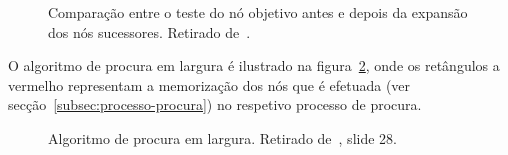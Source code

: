 \begin{figure}[H]
    \begin{center}
    \end{center}
    \caption{Comparação entre o teste do nó objetivo antes e depois da expansão dos nós sucessores.
    Retirado de~\cite{ist:leic:resumos:procura-cega}.}
    \label{fig:alg-proc-largura-teste}
\end{figure}

O algoritmo de procura em largura é ilustrado na figura~\ref{fig:alg-proc-largura}, onde os retângulos a vermelho representam a memorização dos nós que é efetuada (ver secção~\ref{subsec:processo-procura}) no respetivo processo de procura.

\begin{figure}[H]
    \begin{center}
    \end{center}
    \caption{Algoritmo de procura em largura. Retirado de~\cite{isel:iasa:slides:proc-espaco-estados-parte-1}, slide 28.}
    \label{fig:alg-proc-largura}
\end{figure}

